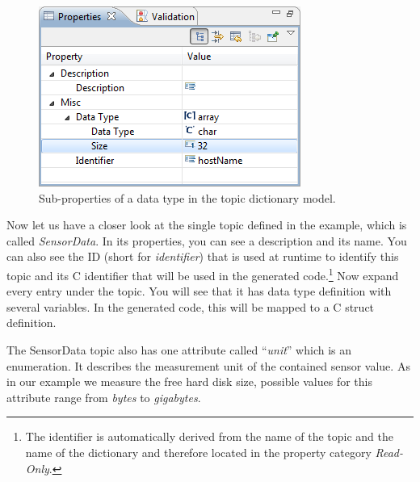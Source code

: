 \begin{figure}[htpb]
	\centering
	\includegraphics[scale=0.75]{figures/xmt_sub-properties.png}
	\caption{Sub-properties of a data type in the topic dictionary model.}
	\label{fig:xmt_sub-properties.png}
\end{figure}

Now let us have a closer look at the single topic defined in the example, which is called \emph{SensorData}.
In its properties, you can see a description and its name.
You can also see the ID (short for \emph{identifier}) that is used at runtime to identify this topic and its C identifier that will be used in the generated code.\footnote{%
	The identifier is automatically derived from the name of the topic and the name of the dictionary and therefore located in the property category \emph{Read-Only}.
}
Now expand every entry under the topic.
You will see that it has data type definition with several variables.
In the generated code, this will be mapped to a C struct definition.

The SensorData topic also has one attribute called ``\emph{unit}'' which is an enumeration.
It describes the measurement unit of the contained sensor value.
As in our example we measure the free hard disk size,
possible values for this attribute range from \emph{bytes} to \emph{gigabytes}.

